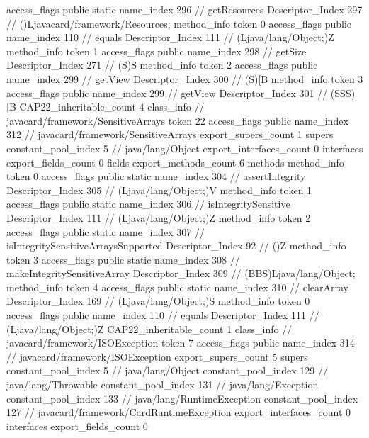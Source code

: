{{{{{					access_flags	public static
					name_index	296		// getResources
					Descriptor_Index	297		// ()Ljavacard/framework/Resources;
				}
				method_info {
					token	0
					access_flags	public
					name_index	110		// equals
					Descriptor_Index	111		// (Ljava/lang/Object;)Z
				}
				method_info {
					token	1
					access_flags	public
					name_index	298		// getSize
					Descriptor_Index	271		// (S)S
				}
				method_info {
					token	2
					access_flags	public
					name_index	299		// getView
					Descriptor_Index	300		// (S)[B
				}
				method_info {
					token	3
					access_flags	public
					name_index	299		// getView
					Descriptor_Index	301		// (SSS)[B
				}
			}
			CAP22_inheritable_count	4
		}
		class_info {		// javacard/framework/SensitiveArrays
			token	22
			access_flags	public
			name_index	312		// javacard/framework/SensitiveArrays
			export_supers_count	1
			supers {
				constant_pool_index	5		// java/lang/Object
			}
			export_interfaces_count	0
			interfaces {
			}
			export_fields_count	0
			fields {
			}
			export_methods_count	6
			methods {
				method_info {
					token	0
					access_flags	public static
					name_index	304		// assertIntegrity
					Descriptor_Index	305		// (Ljava/lang/Object;)V
				}
				method_info {
					token	1
					access_flags	public static
					name_index	306		// isIntegritySensitive
					Descriptor_Index	111		// (Ljava/lang/Object;)Z
				}
				method_info {
					token	2
					access_flags	public static
					name_index	307		// isIntegritySensitiveArraysSupported
					Descriptor_Index	92		// ()Z
				}
				method_info {
					token	3
					access_flags	public static
					name_index	308		// makeIntegritySensitiveArray
					Descriptor_Index	309		// (BBS)Ljava/lang/Object;
				}
				method_info {
					token	4
					access_flags	public static
					name_index	310		// clearArray
					Descriptor_Index	169		// (Ljava/lang/Object;)S
				}
				method_info {
					token	0
					access_flags	public
					name_index	110		// equals
					Descriptor_Index	111		// (Ljava/lang/Object;)Z
				}
			}
			CAP22_inheritable_count	1
		}
		class_info {		// javacard/framework/ISOException
			token	7
			access_flags	public
			name_index	314		// javacard/framework/ISOException
			export_supers_count	5
			supers {
				constant_pool_index	5		// java/lang/Object
				constant_pool_index	129		// java/lang/Throwable
				constant_pool_index	131		// java/lang/Exception
				constant_pool_index	133		// java/lang/RuntimeException
				constant_pool_index	127		// javacard/framework/CardRuntimeException
			}
			export_interfaces_count	0
			interfaces {
			}
			export_fields_count	0
}}}
